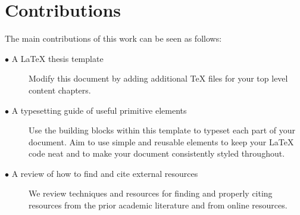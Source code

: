 \section{Contributions} 
	\label{sec:intro_contribs} 
	
	The main contributions of this work can be seen as follows:
	
	\begin{description}	
	
		\item[$\bullet$ A LaTeX thesis template]\hfill
		
		Modify this document by adding additional TeX files for your top level content chapters. 
		
		\item[$\bullet$ A typesetting guide of useful primitive elements]\hfill
		
		Use the building blocks within this template to typeset each part of your document. Aim to use simple and reusable elements to keep your LaTeX code neat and to make your document consistently styled throughout.
		
		\item[$\bullet$ A review of how to find and cite external resources]\hfill
					
		We review techniques and resources for finding and properly citing resources from the prior academic literature and from online resources.
		
	\end{description}